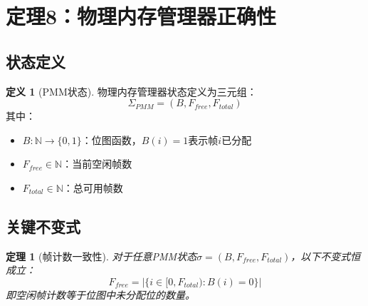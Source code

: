 \documentclass{article}
\newtheorem{theorem}{定理}[section]
\theoremstyle{definition}
\newtheorem{definition}{定义}[section]
\theoremstyle{remark}
\begin{document}
\section{定理8：物理内存管理器正确性}

\subsection{状态定义}

\begin{definition}[PMM状态]
    物理内存管理器状态定义为三元组：
    \[
    \Sigma_{PMM} = (B, F_{free}, F_{total})
    \]
    其中：
    \begin{itemize}
        \item $B: \mathbb{N} \to \{0, 1\}$：位图函数，$B(i) = 1$表示帧$i$已分配
        \item $F_{free} \in \mathbb{N}$：当前空闲帧数
        \item $F_{total} \in \mathbb{N}$：总可用帧数
    \end{itemize}
\end{definition}

\subsection{关键不变式}

\begin{theorem}[帧计数一致性]
    对于任意PMM状态$\sigma = (B, F_{free}, F_{total})$，以下不变式恒成立：
    \[
    F_{free} = |\{i \in [0, F_{total}) : B(i) = 0\}|
    \]
    即空闲帧计数等于位图中未分配位的数量。
\end{theorem}
\end{document}
